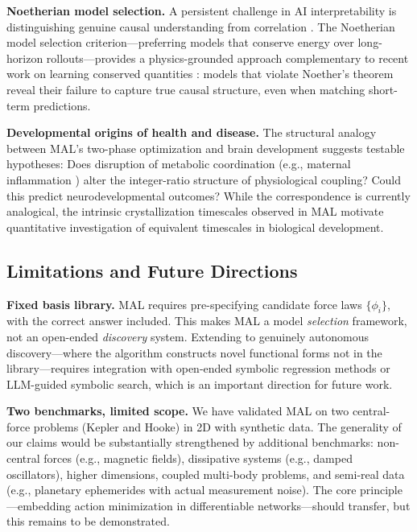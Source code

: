 \documentclass[9pt,twocolumn,twoside]{pnas-new}
\begin{document}
\textbf{Noetherian model selection.} A persistent challenge in AI interpretability is distinguishing genuine causal understanding from correlation \cite{Pearl2019}. The Noetherian model selection criterion---preferring models that conserve energy over long-horizon rollouts---provides a physics-grounded approach complementary to recent work on learning conserved quantities \cite{vanderOuderaa2024, Tanaka2021}: models that violate Noether's theorem reveal their failure to capture true causal structure, even when matching short-term predictions.

\textbf{Developmental origins of health and disease.} The structural analogy between MAL's two-phase optimization and brain development suggests testable hypotheses: Does disruption of metabolic coordination (e.g., maternal inflammation \cite{Frasch2023}) alter the integer-ratio structure of physiological coupling? Could this predict neurodevelopmental outcomes? While the correspondence is currently analogical, the intrinsic crystallization timescales observed in MAL motivate quantitative investigation of equivalent timescales in biological development.

\subsection*{Limitations and Future Directions}
\textbf{Fixed basis library.} MAL requires pre-specifying candidate force laws $\{\phi_i\}$, with the correct answer included. This makes MAL a model \textit{selection} framework, not an open-ended \textit{discovery} system. Extending to genuinely autonomous discovery---where the algorithm constructs novel functional forms not in the library---requires integration with open-ended symbolic regression methods \cite{Udrescu2020, Cranmer2020} or LLM-guided symbolic search, which is an important direction for future work.

\textbf{Two benchmarks, limited scope.} We have validated MAL on two central-force problems (Kepler and Hooke) in 2D with synthetic data. The generality of our claims would be substantially strengthened by additional benchmarks: non-central forces (e.g., magnetic fields), dissipative systems (e.g., damped oscillators), higher dimensions, coupled multi-body problems, and semi-real data (e.g., planetary ephemerides with actual measurement noise). The core principle---embedding action minimization in differentiable networks---should transfer, but this remains to be demonstrated.
\end{document}
